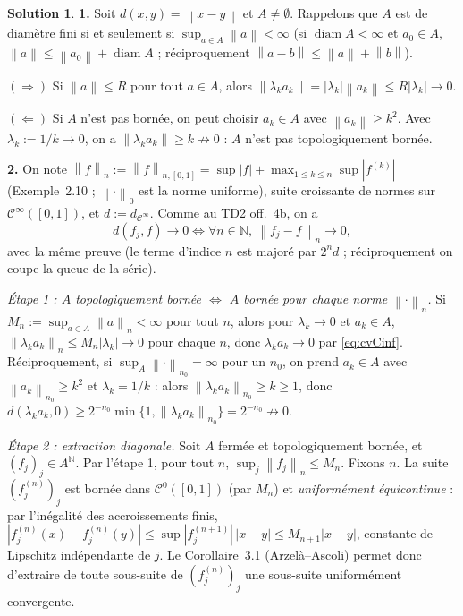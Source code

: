 \documentclass[11pt,a4paper]{article}
\newcommand{\N}{\mathbb{N}}
\newcommand{\diam}{\operatorname{diam}}
\newcommand{\norm}[1]{\left\|#1\right\|}
\newcommand{\Cz}{\mathcal{C}^0}
\newcommand{\Cinf}{\mathcal{C}^\infty}
\theoremstyle{definition}
\newtheorem*{solution}{Solution}
\begin{document}
\begin{solution}
\noindent\textbf{1.} Soit $d(x,y)=\norm{x-y}$ et $A\ne\emptyset$. Rappelons que $A$ est de diamètre fini si et seulement si $\sup_{a\in A}\norm a<\infty$ (si $\diam A<\infty$ et $a_0\in A$, $\norm a\le\norm{a_0}+\diam A$ ; réciproquement $\norm{a-b}\le\norm a+\norm b$).

$(\Rightarrow)$ Si $\norm a\le R$ pour tout $a\in A$, alors $\norm{\lambda_ka_k}=|\lambda_k|\norm{a_k}\le R|\lambda_k|\to0$.

$(\Leftarrow)$ Si $A$ n'est pas bornée, on peut choisir $a_k\in A$ avec $\norm{a_k}\ge k^2$. Avec $\lambda_k:=1/k\to0$, on a $\norm{\lambda_ka_k}\ge k\not\to0$ : $A$ n'est pas topologiquement bornée.

\medskip
\noindent\textbf{2.} On note $\norm f_n:=\norm f_{n,[0,1]}=\sup|f|+\max_{1\le k\le n}\sup|f^{(k)}|$ (Exemple~2.10 ; $\norm\cdot_0$ est la norme uniforme), suite croissante de normes sur $\Cinf([0,1])$, et $d:=d_{\Cinf}$. Comme au TD2 off.~4b, on a
\begin{equation}\label{eq:cvCinf}
d(f_j,f)\to0\iff\forall n\in\N,\ \norm{f_j-f}_n\to0 ,
\end{equation}
avec la même preuve (le terme d'indice $n$ est majoré par $2^nd$ ; réciproquement on coupe la queue de la série).

\emph{Étape 1 : $A$ topologiquement bornée $\iff$ $A$ bornée pour chaque norme $\norm\cdot_n$.} Si $M_n:=\sup_{a\in A}\norm a_n<\infty$ pour tout $n$, alors pour $\lambda_k\to0$ et $a_k\in A$, $\norm{\lambda_ka_k}_n\le M_n|\lambda_k|\to0$ pour chaque $n$, donc $\lambda_ka_k\to0$ par \eqref{eq:cvCinf}. Réciproquement, si $\sup_A\norm\cdot_{n_0}=\infty$ pour un $n_0$, on prend $a_k\in A$ avec $\norm{a_k}_{n_0}\ge k^2$ et $\lambda_k=1/k$ : alors $\norm{\lambda_ka_k}_{n_0}\ge k\ge1$, donc $d(\lambda_ka_k,0)\ge2^{-n_0}\min\{1,\norm{\lambda_ka_k}_{n_0}\}=2^{-n_0}\not\to0$.

\emph{Étape 2 : extraction diagonale.} Soit $A$ fermée et topologiquement bornée, et $(f_j)_j\in A^\N$. Par l'étape 1, pour tout $n$, $\sup_j\norm{f_j}_n\le M_n$. Fixons $n$. La suite $(f_j^{(n)})_j$ est bornée dans $\Cz([0,1])$ (par $M_n$) et \emph{uniformément équicontinue} : par l'inégalité des accroissements finis, $|f_j^{(n)}(x)-f_j^{(n)}(y)|\le\sup|f_j^{(n+1)}|\,|x-y|\le M_{n+1}|x-y|$, constante de Lipschitz indépendante de $j$. Le Corollaire~3.1 (Arzelà--Ascoli) permet donc d'extraire de toute sous-suite de $(f_j^{(n)})_j$ une sous-suite uniformément convergente.


\end{solution}
\end{document}
